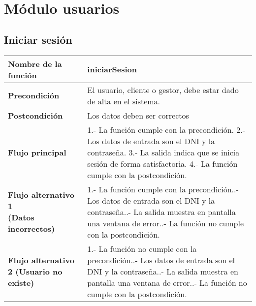 \section{Módulo usuarios}
\subsection{Iniciar sesión}
\begin{table}[H]
    \centering
    \begin{tabularx}{\textwidth}{|>{\bfseries}X|X|}
        \hline
        Nombre de la función                                        & iniciarSesion                                                        \\
        \hline
        Precondición                                                & El usuario, cliente o gestor, debe estar dado de alta en el sistema. \\
        \hline
        Postcondición                                               & Los datos deben ser correctos                                        \\
        \hline
        Flujo principal                                             &
        1.- La función cumple con la precondición.
        2.- Los datos de entrada son el DNI y la contraseña.
        3.- La salida indica que se inicia sesión de forma satisfactoria.
        4.- La función cumple con la postcondición.
        \\
        \hline
        \makecell{Flujo alternativo 1 \newline (Datos incorrectos)} &
        1.- La función cumple con la precondición.\newline
        2.- Los datos de entrada son el DNI y la contraseña.\newline
        3.- La salida muestra en pantalla una ventana de error.\newline
        4.- La función no cumple con la postcondición.\newline                                                                             \\
        \hline
        Flujo alternativo 2 \newline (Usuario no existe)            &
        1.- La función no cumple con la precondición.\newline
        2.- Los datos de entrada son el DNI y la contraseña.\newline
        3.- La salida muestra en pantalla una ventana de error.\newline
        4.- La función no cumple con la postcondición.\newline                                                                             \\
        \hline
    \end{tabularx}
\end{table}

